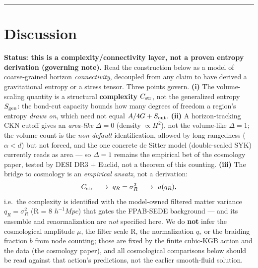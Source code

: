 \documentclass[12pt]{iopart}
\begin{document}
\begin{center}\rule{0.5\linewidth}{0.5pt}\end{center}

\section{Discussion}\label{sec-8}

\textbf{Status: this is a complexity/connectivity layer, not a proven
entropy derivation (governing note).} Read the construction below as a
model of coarse-grained horizon \emph{connectivity}, decoupled from any
claim to have derived a gravitational entropy or a stress tensor. Three
points govern. \textbf{(i)} The volume-scaling quantity is a structural
\textbf{complexity} \(C_{\rm str}\), not the generalized entropy
\(S_{\rm gen}\): the bond-cut capacity bounds how many degrees of
freedom a region's entropy \emph{draws on}, which need not equal
\(A/4G + S_{\rm out}\). \textbf{(ii)} A horizon-tracking CKN cutoff
gives an \emph{area-like} \(\Delta = 0\) (density \(\propto H^2\)), not
the volume-like \(\Delta = 1\); the volume count is the
\emph{non-default} identification, allowed by long-rangedness
(\(\alpha < d\)) but not forced, and the one concrete de Sitter model
(double-scaled SYK) currently reads as area --- so \(\Delta = 1\)
remains the empirical bet of the cosmology paper, tested by DESI DR3 +
Euclid, not a theorem of this counting. \textbf{(iii)} The bridge to
cosmology is an \emph{empirical ansatz}, not a derivation:
\[C_{\rm str}\ \longrightarrow\ q_R = \sigma_R^2\ \longrightarrow\ u(q_R),\]
i.e.~the complexity is identified with the model-owned filtered matter
variance \(q_R = \sigma_R^2\) (R = 8 \(h^{-1}Mpc\)) that gates the
FPAB-SEDE background --- and its ensemble and renormalization are
\emph{not} specified here. We do \textbf{not} infer the cosmological
amplitude \(\mu\), the filter scale R, the normalization \(q_*\) or the
braiding fraction \(b\) from node counting; those are fixed by the
finite cubic-KGB action and the data (the cosmology paper), and all
cosmological comparisons below should be read against that action's
predictions, not the earlier smooth-fluid solution.
\end{document}
